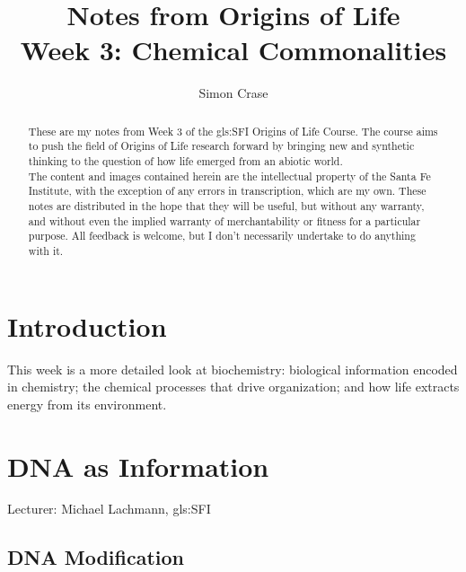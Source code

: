 \documentclass[]{article}
\title{
	Notes from Origins of Life\\
	Week 3: Chemical Commonalities
}
\author{Simon Crase}
\begin{document}
\maketitle

\begin{abstract}
 	These are my notes from Week 3 of the \gls{gls:SFI} Origins of Life Course\cite{sfi2019}. The course aims to push the field of Origins of Life research forward by bringing new and synthetic thinking to the question of how life emerged from an abiotic world.\\
  	The content and images contained herein are the intellectual property of the Santa Fe Institute, with the exception of any errors in transcription, which are my own.
  	These notes are distributed in the hope that they will be useful,
  	but without any warranty, and without even the implied warranty of
  	merchantability or fitness for a particular purpose. All feedback is welcome,
  	but I don't necessarily undertake to do anything with it.
\end{abstract}

\setcounter{tocdepth}{2}
\tableofcontents

\listoffigures

\section{Introduction}

This week is a more detailed look at biochemistry: biological information encoded in chemistry; the chemical processes that drive organization; and how life extracts energy from its environment.

\section{DNA as Information}
Lecturer: Michael Lachmann, \gls{gls:SFI}

\subsection{DNA Modification}
\end{document}
